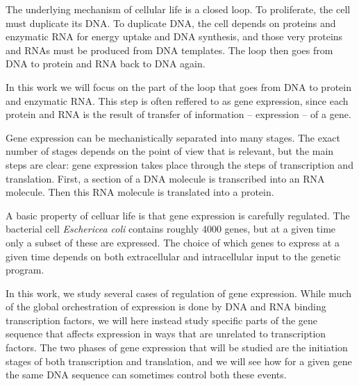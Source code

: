 %

The underlying mechanism of cellular life is a closed loop. To proliferate, the
cell must duplicate its DNA. To duplicate DNA, the cell depends on proteins and
enzymatic RNA for energy uptake and DNA synthesis, and those very proteins and
RNAs must be produced from DNA templates. The loop then goes from DNA to
protein and RNA back to DNA again.

In this work we will focus on the part of the loop that goes from DNA to
protein and enzymatic RNA. This step is often reffered to as gene expression,
since each protein and RNA is the result of transfer of information --
expression -- of a gene.

Gene expression can be mechanistically separated into many stages. The exact
number of stages depends on the point of view that is relevant, but the main
steps are clear: gene expression takes place through the steps of transcription
and translation. First, a section of a DNA molecule is transcribed into an RNA
molecule. Then this RNA molecule is translated into a protein.

A basic property of celluar life is that gene expression is carefully
regulated. The bacterial cell \textit{Eschericea coli} contains roughly 4000
genes, but at a given time only a subset of these are expressed. The choice of
which genes to express at a given time depends on both extracellular and
intracellular input to the genetic program.

In this work, we study several cases of regulation of gene expression. While
much of the global orchestration of expression is done by DNA and RNA binding
transcription factors, we will here instead study specific parts of the gene
sequence that affects expression in ways that are unrelated to transcription
factors. The two phases of gene expression that will be studied are the
initiation stages of both transcription and translation, and we will see how
for a given gene the same DNA sequence can sometimes control both these events.
